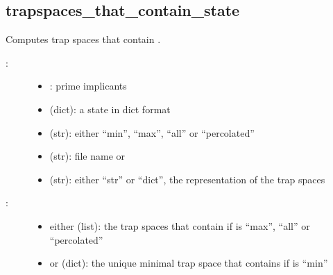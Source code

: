 \documentclass[letterpaper,10pt,english]{sphinxmanual}
\begin{document}
\subsection{trapspaces\_that\_contain\_state}
\label{\detokenize{AspSolver:trapspaces-that-contain-state}}\label{\detokenize{AspSolver:id5}}

\begin{fulllineitems}
\label{\detokenize{AspSolver:PyBoolNet.AspSolver.trapspaces_that_contain_state}}
Computes trap spaces that contain .
\begin{description}
\item[{:}] \leavevmode\begin{itemize}
\item {} 
: prime implicants

\item {} 
 (dict): a state in dict format

\item {} 
 (str): either “min”, “max”, “all” or “percolated”

\item {} 
 (str): file name or 

\item {} 
 (str): either “str” or “dict”, the representation of the trap spaces

\end{itemize}

\item[{:}] \leavevmode\begin{itemize}
\item {} 
either  (list): the trap spaces that contain  if  is “max”, “all” or “percolated”

\item {} 
or  (dict): the unique minimal trap space that contains  if  is “min”

\end{itemize}


\end{description}
\end{fulllineitems}
\end{document}
